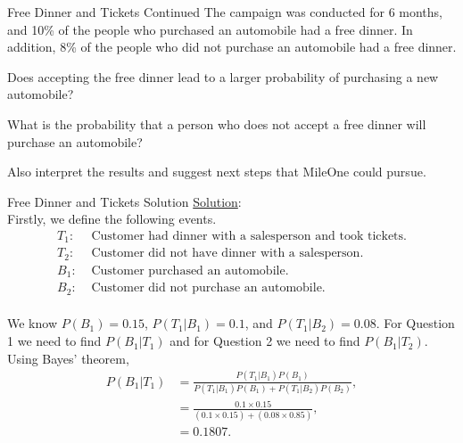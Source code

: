 \documentclass[pdf]{beamer}
\theoremstyle{remark}
\theoremstyle{definition}
\begin{document}
\begin{frame}[t]{Free Dinner and Tickets Continued}
The campaign was conducted for 6 months, and 10\% of the people who purchased an automobile had a free dinner. In addition, 8\% of the people who did not purchase an automobile had a free dinner. \\
\vspace{1.0ex}
\begin{description}
\item [Question 1] Does accepting the free dinner lead to a larger probability of purchasing a new automobile?
\item [Question 2] What is the probability that a person who does not accept a free dinner will purchase
an automobile?
\item Also interpret the results and suggest next steps that MileOne could pursue.
\end{description}
\end{frame}

\begin{frame}[t]{Free Dinner and Tickets Solution}
\small
\underline{Solution}:\\
\vspace{1.5ex}
Firstly, we define the following events. \\
\vspace{-3.0ex}
\begin{align*}
T_1\!\!:  & \text{ Customer had dinner with a salesperson and took tickets.} \\
T_2\!\!:  & \text{ Customer did not have dinner with a salesperson.} \\
B_1\!\!:  & \text{ Customer purchased an automobile.} \\
B_2\!\!:  & \text{ Customer did not purchase an automobile.} 
\end{align*}
\\
\vspace{-0.0ex}
We know $P(B_1) = 0.15$, $P(T_1 | B_1) = 0.1$, and $P(T_1|B_2)=0.08$. For {\color{franklinblue} Question 1} we need to find $P(B_1|T_1)$ and for  {\color{franklinblue} Question 2} we need to find $P(B_1|T_2)$.  Using Bayes' theorem,  \\
\vspace{-1.0ex}
\begin{align*}
P(B_1 | T_1) & = \frac{P(T_1 | B_1) P(B_1)}{P(T_1 | B_1) P(B_1) + P(T_1 | B_2) P(B_2)}, \\
             & = \frac{0.1 \times 0.15}{(0.1 \times 0.15)+(0.08 \times 0.85)},  \\
             & = 0.1807.
\end{align*}
\end{frame}
\end{document}
